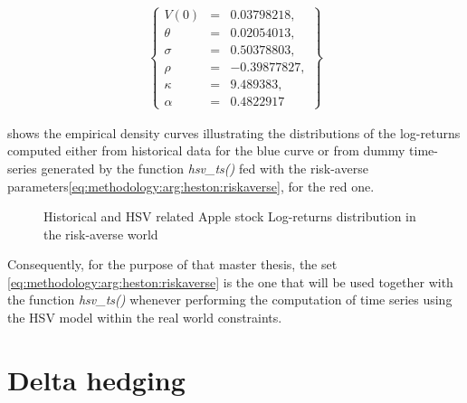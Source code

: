 \documentclass[a4paper, 12pt]{report}
\begin{document}
\begin{align}
  \left \{
  \begin{array}{lcl}
    V(0) &= &0.03798218, \\
    \theta &= &0.02054013, \\
    \sigma &= &0.50378803, \\
    \rho &= &-0.39877827, \\
    \kappa &= &9.489383, \\
    \alpha & = &0.4822917
  \end{array}
  \right \}  
  \label{eq:methodology:arg:heston:riskaverse}
\end{align}


 shows the empirical density curves illustrating the distributions of the log-returns computed either from historical data for the blue curve or from dummy time-series generated by the function \textit{hsv\_ts()} fed with the risk-averse parameters\ref{eq:methodology:arg:heston:riskaverse}, for the red one.


\begin{figure}[h]
  \centering
  
  \caption{Historical and HSV related Apple stock Log-returns distribution in the risk-averse world}
  \label{p:methodology:density:aapl:heston:riskaverse}
\end{figure}

Consequently, for the purpose of that master thesis, the set \ref{eq:methodology:arg:heston:riskaverse} is the one that will be used together with the function \textit{hsv\_ts()} whenever performing the computation of time series using the HSV model within the real world constraints.



\section{Delta hedging}
\label{sec:methodology:delta}
\end{document}
